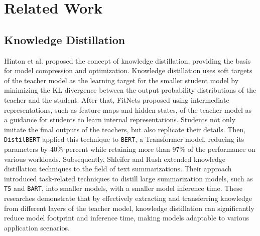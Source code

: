 \documentclass{article}
\begin{document}
    \section{Related Work}
    \subsection{Knowledge Distillation}
    \hspace*{1em} Hinton et al. proposed the concept of knowledge distillation\cite{Hinton2015}, providing the basis for model compression and optimization. Knowledge distillation uses soft targets of the teacher model as the learning target for the smaller student model by minimizing the KL divergence between the output probability distributions of the teacher and the student. After that, FitNets\cite{romero2015fitnets} proposed using intermediate representations, such as feature maps and hidden states, of the teacher model as a guidance for students to learn internal representations. Students not only imitate the final outputs of the teachers, but also replicate their details. Then, \texttt{DistilBERT}\cite{sanh2019distilbert} applied this technique to \texttt{BERT}, a Transformer model, reducing its parameters by 40\% percent while retaining more than 97\% of the performance on various workloads. Subsequently, Shleifer and Rush extended knowledge distillation techniques to the field of text summarizations\cite{shleifer2020distillation}. Their approach introduced task-related techniques to distill large summarization models, such as \texttt{T5} and \texttt{BART}, into smaller models, with a smaller model inference time. These researches demonstrate that by effectively extracting and transferring knowledge from different layers of the teacher model, knowledge distillation can significantly reduce model footprint and inference time, making models adaptable to various application scenarios.
\end{document}
